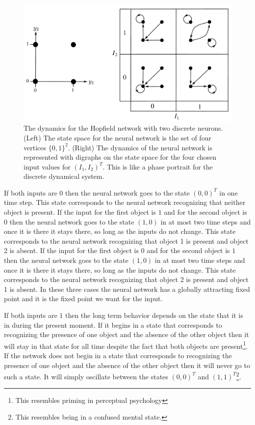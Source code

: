 \begin{figure}[ht]
\centering
\includegraphics[scale=0.40]{./images/TwoNodeHopfield.pdf}
\caption{The dynamics for the Hopfield network with two discrete neurons. 
(Left) The state space for the neural network is the set of four vertices 
$\{0,1\}^2$.  (Right) The dynamics of the neural network is represented with 
digraphs on the state space for the four chosen input values for $(I_1,I_2)^T$. 
This is like a phase portrait for the discrete dynamical system.}
\label{F:TwoNodeHopfield}  
\end{figure}

   If both inputs are $0$ then the neural network goes to the state $(0,0)^T$ 
in one time step.  This state corresponds to the neural network recognizing 
that neither object is present.  If the input for the first object is $1$ and 
for the second object is $0$ then the neural network goes to the state $(1,0)$
in at most two time steps and once it is there it stays there, so long as the
inputs do not change.  This state corresponds to the neural network recognizing
that object 1 is present and object 2 is absent.  If the input for the first 
object is $0$ and for the second object is $1$ then the neural network goes to 
the state $(1,0)$ in at most two time steps and once it is there it 
stays there, so long as the inputs do not change.  This state corresponds to 
the neural network recognizing that object 2 is present and object 1 is absent.
In these three cases the neural network has a globally attracting fixed point
and it is the fixed point we want for the input.

   If both inputs are $1$ then the long term behavior depends on the state
that it is in during the present moment.  If it begins in a state that 
corresponds to recognizing the presence of one object and the absence of the 
other object then it will stay in that state for all time despite the fact that 
both objects are present\footnote{This resembles priming in perceptual 
psychology}.  If the network does not begin in a state that corresponds to 
recognizing the presence of one object and the absence of the other object then 
it will never go to such a state.  It will simply oscillate between the states 
$(0,0)^T$ and $(1,1)^T$\footnote{This resembles being in a confused mental 
state.}. 


